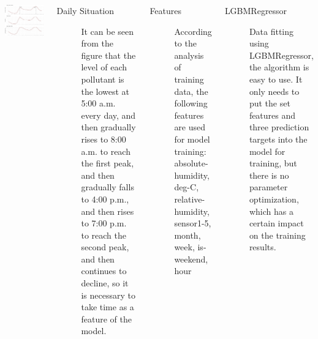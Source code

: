 \documentclass{tikzposter} %
\begin{document}
\begin{columns}
{\begin{tikzfigure}
	\includegraphics[scale=1.0]{figures//p5.eps}
\end{tikzfigure}

\begin{description}
	\item[Daily Situation]
	It can be seen from the figure that the level of each pollutant is the lowest at 5:00 a.m. every day, and then gradually rises to 8:00 a.m. to reach the first peak, and then gradually falls to 4:00 p.m., and then rises to 7:00 p.m. to reach the second peak, and then continues to decline, so it is necessary to take time as a feature of the model.
\end{description}

}


{
\begin{description}
	\item[Features] 
	According to the analysis of training data, the following features are used for model training:
	 absolute-humidity, 
	 deg-C, 
	 relative-humidity, 
	 sensor1-5, 
	 month, 
	 week, 
	 is-weekend, 
	 hour
\end{description}

\vspace{.5cm}
\begin{description}
  	\item[LGBMRegressor] 
  	Data fitting using LGBMRegressor, the algorithm is easy to use. 
  	It only needs to put the set features and three prediction targets into the model for training, 
  	but there is no parameter optimization, which has a certain impact on the training results.
\end{description}


}
\end{columns}
\end{document}
